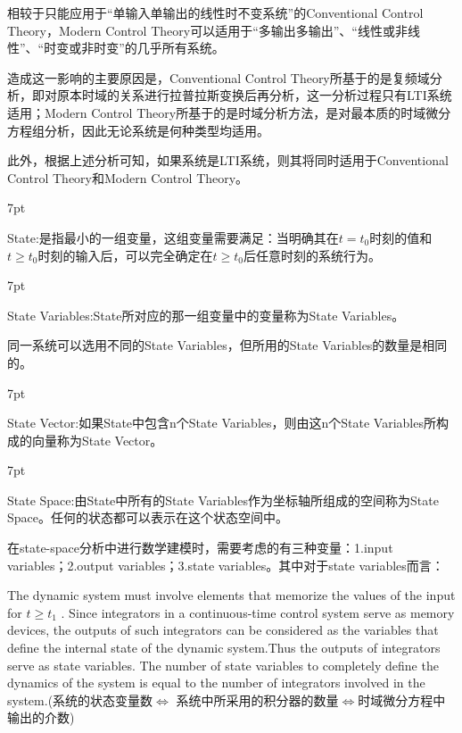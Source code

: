 \documentclass{article}
\numberwithin{equation}{section}
\numberwithin{figure}{section}
\newenvironment{formal}{%
\def\FrameCommand{%
\hspace{1pt}%
{\color{DarkBlue}\vrule width 2pt}%
{\color{formalshade}\vrule width 4pt}%
\colorbox{formalshade}%
}%
\MakeFramed{\advance\hsize-\width\FrameRestore}%
\noindent\hspace{-4.55pt}%
\begin{adjustwidth}{}{7pt}%
\vspace{2pt}\vspace{2pt}%
}
{%
\vspace{2pt}\end{adjustwidth}\endMakeFramed%
}
\begin{document}
相较于只能应用于“单输入单输出的线性时不变系统”的Conventional Control Theory，Modern Control Theory可以适用于“多输出多输出”、“线性或非线性”、“时变或非时变”的几乎所有系统。

造成这一影响的主要原因是，Conventional Control Theory所基于的是复频域分析，即对原本时域的关系进行拉普拉斯变换后再分析，这一分析过程只有LTI系统适用；Modern Control Theory所基于的是时域分析方法，是对最本质的时域微分方程组分析，因此无论系统是何种类型均适用。

此外，根据上述分析可知，如果系统是LTI系统，则其将同时适用于Conventional Control Theory和Modern Control Theory。

\begin{formal}
    State:是指最小的一组变量，这组变量需要满足：当明确其在$t=t_0$时刻的值和$t≥t_0$时刻的输入后，可以完全确定在$t≥t_0$后任意时刻的系统行为。
\end{formal}

\begin{formal}
    State Variables:State所对应的那一组变量中的变量称为State Variables。
\end{formal}

同一系统可以选用不同的State Variables，但所用的State Variables的数量是相同的。

\begin{formal}
    State Vector:如果State中包含n个State Variables，则由这n个State Variables所构成的向量称为State Vector。
\end{formal}

\begin{formal}
    State Space:由State中所有的State Variables作为坐标轴所组成的空间称为State Space。任何的状态都可以表示在这个状态空间中。
\end{formal}

在state-space分析中进行数学建模时，需要考虑的有三种变量：1.input variables；2.output variables；3.state variables。其中对于state variables而言：

The dynamic system must involve elements that memorize the values of the input for
$t ≥ t_1$ . Since integrators in a continuous-time control system serve as memory devices,
the outputs of such integrators can be considered as the variables that define the internal state of the dynamic system.Thus the outputs of integrators serve as state variables.
The number of state variables to completely define the dynamics of the system is equal
to the number of integrators involved in the system.(系统的状态变量数$\Longleftrightarrow$ 系统中所采用的积分器的数量$\Longleftrightarrow$时域微分方程中输出的介数)
\end{document}
